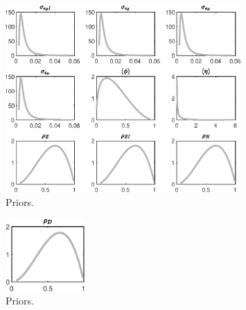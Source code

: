  
\begin{figure}[H]
\centering
\includegraphics[width=0.80\textwidth]{BRS_comovement/graphs/BRS_comovement_Priors1}
\caption{Priors.}\label{Fig:Priors:1}
\end{figure}
\begin{figure}[H]
\centering
\includegraphics[width=0.27\textwidth]{BRS_comovement/graphs/BRS_comovement_Priors2}
\caption{Priors.}\label{Fig:Priors:2}
\end{figure}
 
